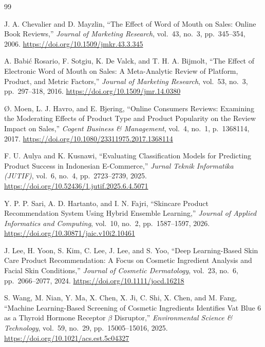 \documentclass[11pt,a4paper]{article}
\begin{document}
\begingroup\small
\begin{thebibliography}{99}
\setlength{\itemsep}{0pt}
\setlength{\parskip}{1pt}

J. A. Chevalier and D. Mayzlin, ``The Effect of Word of Mouth on Sales: Online Book Reviews,'' \emph{Journal of Marketing Research}, vol.~43, no.~3, pp.~345--354, 2006. \url{https://doi.org/10.1509/jmkr.43.3.345}

A. Babi\'{c} Rosario, F. Sotgiu, K. De Valck, and T. H. A. Bijmolt, ``The Effect of Electronic Word of Mouth on Sales: A Meta-Analytic Review of Platform, Product, and Metric Factors,'' \emph{Journal of Marketing Research}, vol.~53, no.~3, pp.~297--318, 2016. \url{https://doi.org/10.1509/jmr.14.0380}

{\O}. Moen, L. J. Havro, and E. Bjering, ``Online Consumers Reviews: Examining the Moderating Effects of Product Type and Product Popularity on the Review Impact on Sales,'' \emph{Cogent Business \& Management}, vol.~4, no.~1, p.~1368114, 2017. \url{https://doi.org/10.1080/23311975.2017.1368114}

F. U. Aulya and K. Kusnawi, ``Evaluating Classification Models for Predicting Product Success in Indonesian E-Commerce,'' \emph{Jurnal Teknik Informatika (JUTIF)}, vol.~6, no.~4, pp.~2723--2739, 2025. \url{https://doi.org/10.52436/1.jutif.2025.6.4.5071}

Y. P. P. Sari, A. D. Hartanto, and I. N. Fajri, ``Skincare Product Recommendation System Using Hybrid Ensemble Learning,'' \emph{Journal of Applied Informatics and Computing}, vol.~10, no.~2, pp.~1587--1597, 2026. \url{https://doi.org/10.30871/jaic.v10i2.10461}

J. Lee, H. Yoon, S. Kim, C. Lee, J. Lee, and S. Yoo, ``Deep Learning-Based Skin Care Product Recommendation: A Focus on Cosmetic Ingredient Analysis and Facial Skin Conditions,'' \emph{Journal of Cosmetic Dermatology}, vol.~23, no.~6, pp.~2066--2077, 2024. \url{https://doi.org/10.1111/jocd.16218}

S. Wang, M. Nian, Y. Ma, X. Chen, X. Ji, C. Shi, X. Chen, and M. Fang, ``Machine Learning-Based Screening of Cosmetic Ingredients Identifies Vat Blue 6 as a Thyroid Hormone Receptor $\beta$ Disruptor,'' \emph{Environmental Science \& Technology}, vol.~59, no.~29, pp.~15005--15016, 2025. \url{https://doi.org/10.1021/acs.est.5c04327}


\end{thebibliography}
\end{document}

